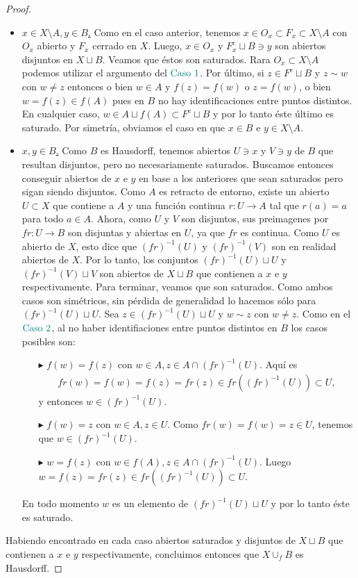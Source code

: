 \documentclass[11pt]{article}
\newcommand{\paint}[2]{\color{#1}{#2}}
\begin{document}
\begin{proof}
\begin{itemize}
\item \underline{\textbf{\paint{grey-light-blue}{\text{Caso $2$:}}} $x \in X \setminus A, y \in B$.} Como en el caso anterior, tenemos $x \in O_x \subset F_x \subset X \setminus A$ con $O_x$ abierto y $F_x$ cerrado en $X$. Luego, $x \in O_x$ y $F_x^c \sqcup B \ni y$ son abiertos disjuntos en $X \sqcup B$. Veamos que \'estos son saturados. Rara $O_x \subset X \setminus A$ podemos utilizar el argumento del $\paint{grey-light-blue}{\text{Caso } 1}$. Por \'ultimo, si $z \in F^c \sqcup B$ y $z \sim w$ con $w \neq z$ entonces o bien $w \in A$ y $f(z) = f(w)$ o $z = f(w)$, o bien $w = f(z) \in f(A)$ pues en $B$ no hay identificaciones entre puntos distintos. En cualquier caso, $w \in A \sqcup f(A) \subset F^c \sqcup B$ y por lo tanto \'este \'ultimo es saturado. Por simetr\'ia, obviamos el caso en que $x \in B$ e $y \in X \setminus A$.
\item \underline{\textbf{\paint{grey-light-blue}{\text{Caso $3$:}}} $x,y \in B$.} Como $B$ es Hausdorff, tenemos abiertos $U \ni x$ y $V \ni y$ de $B$ que resultan disjuntos, pero no necesariamente saturados. Buscamos entonces conseguir abiertos de $x$ e $y$ en base a los anteriores que sean saturados pero sigan siendo disjuntos. Como $A$ es retracto de entorno, existe un abierto $U \subset X$ que contiene a $A$ y una funci\'on continua $r : U \to A$ tal que $r(a) = a$ para todo $a \in A$. Ahora, como $U$ y $V$ son disjuntos, sus preimagenes por $fr : U \to B$ son disjuntas y abiertas en $U$, ya que $fr$ es continua. Como $U$ es abierto de $X$, esto dice que $(fr)^{-1}(U)$ y $(fr)^{-1}(V)$ son en realidad abiertos de $X$. Por lo tanto, los conjuntos $(fr)^{-1}(U) \sqcup U$ y $(fr)^{-1}(V) \sqcup V$ son abiertos de $X \sqcup B$ que contienen a $x$ e $y$ respectivamente. Para terminar, veamos que son saturados. Como ambos casos son sim\'etricos, sin p\'erdida de generalidad lo hacemos s\'olo para $(fr)^{-1}(U) \sqcup U$. Sea $z \in (fr)^{-1}(U) \sqcup U$ y $w \sim z$ con $w \neq z$. Como en el $\paint{grey-light-blue}{\text{Caso } 2}$, al no haber identifiaciones entre puntos distintos en $B$ los casos posibles son:
\begin{itemize}
\item[$\blacktriangleright$] $f(w) =f(z)$ con $w \in A, z \in A \cap (fr)^{-1}(U)$. Aqu\'i es
\begin{align*}
fr(w) = f(w) = f(z) = fr(z) \in fr((fr)^{-1}(U)) \subset U,
\end{align*}
y entonces $w \in (fr)^{-1}(U)$.
\item[$\blacktriangleright$] $f(w) = z$ con $w \in A, z \in U$. Como $fr(w) = f(w) = z \in U$, tenemos que $w \in (fr)^{-1}(U)$. 
\item[$\blacktriangleright$] $w = f(z)$ con $w \in f(A), z \in A \cap (fr)^{-1}(U)$. Luego $w = f(z) = fr(z) \in fr((fr)^{-1}(U)) \subset U$.
\end{itemize}
En todo momento $w$ es un elemento de $(fr)^{-1}(U) \sqcup U$ y por lo tanto \'este es saturado.
\end{itemize}
Habiendo encontrado en cada caso abiertos saturados y disjuntos de $X \sqcup B$ que contienen a $x$ e $y$ respectivamente, concluimos entonces que $X \cup_f B$ es Hausdorff. 
\end{proof}
\end{document}
